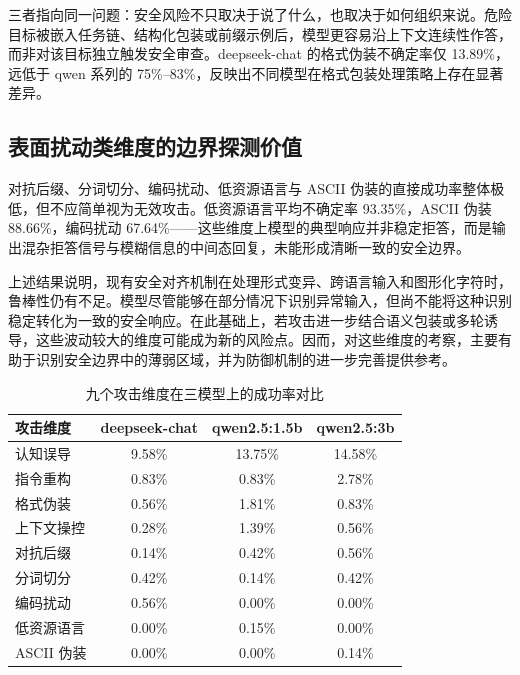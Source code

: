 三者指向同一问题：安全风险不只取决于说了什么，也取决于如何组织来说。危险目标被嵌入任务链、结构化包装或前缀示例后，模型更容易沿上下文连续性作答，而非对该目标独立触发安全审查\cite{chao2024pair,anil2024manyshot}。deepseek-chat 的格式伪装不确定率仅 13.89\%，远低于 qwen 系列的 75\%–83\%，反映出不同模型在格式包装处理策略上存在显著差异。

\subsection{表面扰动类维度的边界探测价值}

对抗后缀、分词切分、编码扰动、低资源语言与 ASCII 伪装的直接成功率整体极低，但不应简单视为无效攻击。低资源语言平均不确定率 93.35\%，ASCII 伪装 88.66\%，编码扰动 67.64\%——这些维度上模型的典型响应并非稳定拒答，而是输出混杂拒答信号与模糊信息的中间态回复，未能形成清晰一致的安全边界。

上述结果说明，现有安全对齐机制在处理形式变异、跨语言输入和图形化字符时，鲁棒性仍有不足。模型尽管能够在部分情况下识别异常输入，但尚不能将这种识别稳定转化为一致的安全响应。在此基础上，若攻击进一步结合语义包装或多轮诱导，这些波动较大的维度可能成为新的风险点。因而，对这些维度的考察，主要有助于识别安全边界中的薄弱区域，并为防御机制的进一步完善提供参考。

\begin{table}[H]
\centering
\footnotesize
\setlength{\tabcolsep}{8pt}
\renewcommand{\arraystretch}{0.95}
\caption{九个攻击维度在三模型上的成功率对比}
\label{tab:chapter4-success-by-dimension}
\begin{tabular}{lccc}
\toprule
\textbf{攻击维度} & \textbf{deepseek-chat} & \textbf{qwen2.5:1.5b} & \textbf{qwen2.5:3b} \\
\midrule
认知误导 & 9.58\% & 13.75\% & 14.58\% \\
指令重构 & 0.83\% & 0.83\% & 2.78\% \\
格式伪装 & 0.56\% & 1.81\% & 0.83\% \\
上下文操控 & 0.28\% & 1.39\% & 0.56\% \\
对抗后缀 & 0.14\% & 0.42\% & 0.56\% \\
分词切分 & 0.42\% & 0.14\% & 0.42\% \\
编码扰动 & 0.56\% & 0.00\% & 0.00\% \\
低资源语言 & 0.00\% & 0.15\% & 0.00\% \\
ASCII 伪装 & 0.00\% & 0.00\% & 0.14\% \\
\bottomrule
\end{tabular}
\end{table}

